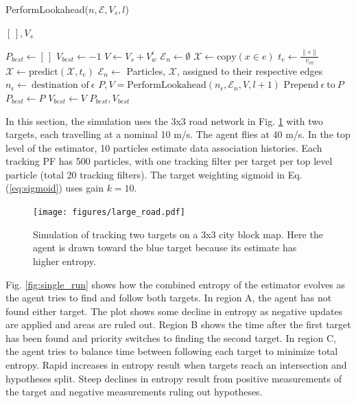 \documentclass[letterpaper, 10 pt, conference]{ieeeconf}  %
\begin{document}
\begin{algorithm}
\caption{PerformLookahead($n, \mathcal{E}, V_s, l$)}
\begin{algorithmic}[1]
\RETURN $[\,], V_s$
\ENDIF

\STATE $P_{best} \gets[\,]$
\STATE $V_{best} \gets -1$
\STATE $V \gets V_s + V_w^\epsilon$ 
\STATE $\mathcal{E}_n \gets \emptyset$
\STATE $\mathcal{X} \gets \text{copy}(x \in e)$
\STATE $t_e \gets \frac{\lVert e \rVert}{v_{e0}}$
\STATE $\mathcal{X} \gets \text{predict}(\mathcal{X}, t_e)$
\STATE $\mathcal{E}_n \gets$ Particles, $\mathcal{X}$, assigned to their respective edges
\ENDIF
\ENDFOR
\STATE $n_\epsilon \gets \ \text{destination of} \ \epsilon$
\STATE $P, V = \text{PerformLookahead}(n_\epsilon, \mathcal{E}_n, V, l+1)$
\STATE $\text{Prepend} \ \epsilon \ \text{to} \ P$
\STATE $P_{best} \gets P$
\STATE $V_{best} \gets V$
\ENDIF
\ENDFOR
\RETURN $P_{best}, V_{best}$
\end{algorithmic}
\label{lookaheadStep}
\end{algorithm}


In this section, the simulation uses the 3x3 road network in Fig. \ref{fig:larger_roads} with two targets, each travelling at a nominal 10 m/s. The agent flies at 40 m/s. In the top level of the estimator, 10 particles estimate data association histories. Each tracking PF has 500 particles, with one tracking filter per target per top level particle (total 20 tracking filters). The target weighting sigmoid in Eq. (\ref{eq:sigmoid}) uses gain $k=10$.

\begin{figure}
\centering
\texttt{[image: figures/large\_road.pdf]}
\caption{Simulation of tracking two targets on a 3x3 city block map. Here the agent is drawn toward the blue target because its estimate has higher entropy.}
\label{fig:larger_roads}
\end{figure}

Fig. \ref{fig:single_run} shows how the combined entropy of the estimator evolves as the agent tries to find and follow both targets. In region A, the agent has not found either target. The plot shows some decline in entropy as negative updates are applied and areas are ruled out. Region B shows the time after the first target has been found and priority switches to finding the second target. In region C, the agent tries to balance time between following each target to minimize total entropy. Rapid increases in entropy result when targets reach an intersection and hypotheses split. Steep declines in entropy result from positive measurements of the target and negative measurements ruling out hypotheses.
\end{document}
